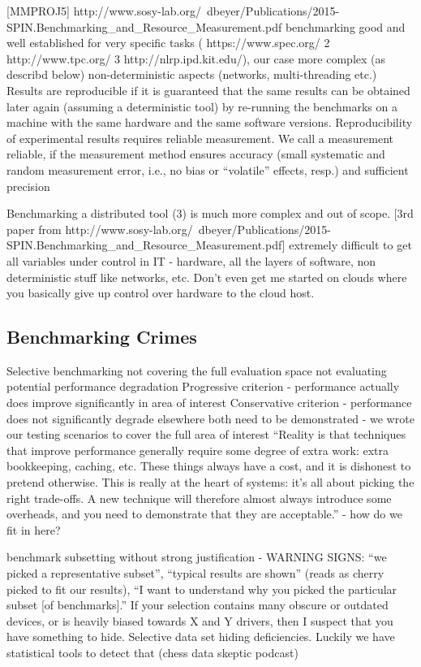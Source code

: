 \documentclass{uvamscse}
\begin{document}
[MMPROJ5] http://www.sosy-lab.org/~dbeyer/Publications/2015-SPIN.Benchmarking\_and\_Resource\_Measurement.pdf
benchmarking good and well established for very specific tasks ( https://www.spec.org/ 2 http://www.tpc.org/ 3 http://nlrp.ipd.kit.edu/), our case more complex (as describd below)
non-deterministic aspects (networks, multi-threading etc.)
Results are reproducible if it is guaranteed that the same results can be obtained later again (assuming a deterministic tool) by re-running the benchmarks on a machine with the same hardware and the same software versions. Reproducibility of experimental results requires reliable measurement. We call a measurement reliable, if the measurement method ensures accuracy (small systematic and random measurement error, i.e., no bias or “volatile” effects, resp.) and sufficient precision

Benchmarking a distributed tool (3) is much more complex and out of scope. [3rd paper from http://www.sosy-lab.org/~dbeyer/Publications/2015-SPIN.Benchmarking\_and\_Resource\_Measurement.pdf]
extremely difficult to get all variables under control in IT - hardware, all the layers of software, non deterministic stuff like networks, etc. Don't even get me started on clouds where you basically give up control over hardware to the cloud host.

\subsection{Benchmarking Crimes}

\cite{GerHeiBench}
Selective benchmarking
  not covering the full evaluation space
  not evaluating potential performance degradation
    Progressive criterion - performance actually does improve significantly in area of interest
    Conservative criterion - performance does not significantly degrade elsewhere
    both need to be demonstrated - we wrote our testing scenarios to cover the full area of interest
    “Reality is that techniques that improve performance generally require some degree of extra work: extra bookkeeping, caching, etc. These things always have a cost, and it is dishonest to pretend otherwise. This is really at the heart of systems: it's all about picking the right trade-offs. A new technique will therefore almost always introduce some overheads, and you need to demonstrate that they are acceptable.” - how do we fit in here?

benchmark subsetting without strong justification - WARNING SIGNS: “we picked a representative subset”, “typical results are shown” (reads as cherry picked to fit our results), “I want to understand why you picked the particular subset [of benchmarks].” If your selection contains many obscure or outdated devices, or is heavily biased towards X and Y drivers, then I suspect that you have something to hide.
Selective data set hiding deficiencies. Luckily we have statistical tools to detect that (chess data skeptic podcast)
\end{document}
